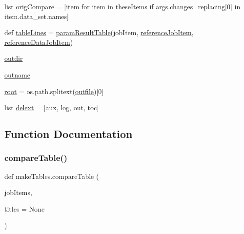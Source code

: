 \begin{DoxyCompactItemize}
\item 
list \mbox{\hyperlink{namespacemakeTables_ae8cf1b5e2c890eceafc163e69a0923b7}{orig\+Compare}} = \mbox{[}item for item in \mbox{\hyperlink{namespacemakeTables_a86cc3672f98bbfb5411b7d0fc643f57d}{these\+Items}} \mbox{\hyperlink{plotTT_8m_a722e57dd98d67aec0b3589ce8efff8bb}{if}} args.\+changes\+\_\+replacing\mbox{[}0\mbox{]} in item.\+data\+\_\+set.\+names\mbox{]}
\item 
def \mbox{\hyperlink{namespacemakeTables_a0759ca842c69d98c6d9e341685e8bf53}{table\+Lines}} = \mbox{\hyperlink{namespacemakeTables_a05676f114347275725afdc58dc3656ff}{param\+Result\+Table}}(job\+Item, \mbox{\hyperlink{namespacemakeTables_a1cae4337555e5967aef37fdffadd4dc4}{reference\+Job\+Item}}, \mbox{\hyperlink{namespacemakeTables_ad2d53b08380c10346fc6ff9a0e12942b}{reference\+Data\+Job\+Item}})
\item 
\mbox{\hyperlink{namespacemakeTables_a9de2c41c96b8a31c4be31b641f2f8831}{outdir}}
\item 
\mbox{\hyperlink{namespacemakeTables_a2beb919bb42e482900accc9ed7481ccc}{outname}}
\item 
\mbox{\hyperlink{namespacemakeTables_a179f7e6a13b197ab0b1a120ee7d3a36a}{root}} = os.\+path.\+splitext(\mbox{\hyperlink{namespacemakeTables_a5b2a60e5426f013550a0491f01657fdb}{outfile}})\mbox{[}0\mbox{]}
\item 
list \mbox{\hyperlink{namespacemakeTables_a072b702b01010d8b98027ffff5882ec5}{delext}} = \mbox{[}\textquotesingle{}aux\textquotesingle{}, \textquotesingle{}log\textquotesingle{}, \textquotesingle{}out\textquotesingle{}, \textquotesingle{}toc\textquotesingle{}\mbox{]}
\end{DoxyCompactItemize}


\subsection{Function Documentation}
\mbox{\label{namespacemakeTables_a97f7aac98d97fef173d6ba74a446ec4b}} 
\subsubsection{\texorpdfstring{compare\+Table()}{compareTable()}}
{\footnotesize\ttfamily def make\+Tables.\+compare\+Table (\begin{DoxyParamCaption}\item[{}]{job\+Items,  }\item[{}]{titles = {\ttfamily None} }\end{DoxyParamCaption})}

